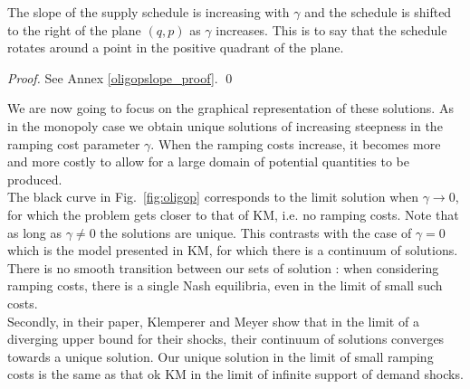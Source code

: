 \begin{proposition}\label{oligoslope_prop}
The slope of the supply schedule is increasing with $\gamma$ and the schedule is shifted to the right of the plane $(q,p)$ as $\gamma$ increases. This is to say that the schedule rotates around a point in the positive quadrant of the plane. 
\end{proposition}
\begin{proof}
See Annex \ref{oligopslope_proof}. \qed
\end{proof}

We are now going to focus on the graphical representation of these solutions. As in the monopoly case we obtain unique solutions of increasing steepness in the ramping cost parameter $\gamma$. When the ramping costs increase, it becomes more and more costly to allow for a large domain of potential quantities to be produced. \\

The black curve in Fig.~\ref{fig:oligop} corresponds to the limit solution when $\gamma\to0$, for which the problem gets closer to that of KM, i.e. no ramping costs. Note that as long as $\gamma\neq0$ the solutions are unique. This contrasts with the case of $\gamma=0$ which is the model presented in KM, for which there is a continuum of solutions. There is no smooth transition between our sets of solution : when considering ramping costs, there is a single Nash equilibria, even in the limit of small such costs.\\

Secondly, in their paper, Klemperer and Meyer show that in the limit of a diverging upper bound for their shocks, their continuum of solutions converges towards a unique solution. Our unique solution in the limit of small ramping costs is the same as that ok KM in the limit of infinite support of demand shocks.\\

